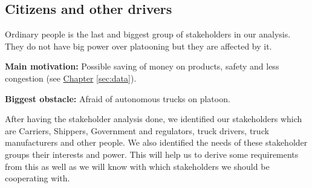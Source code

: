 \subsection{Citizens and other drivers}
% 
Ordinary people is the last and biggest group of stakeholders in our analysis. They do not have big power over platooning but they are affected by it.
% 
\par \textbf{Main motivation:} Possible saving of money on products, safety and less congestion (see \hyperref[sec:data]{Chapter} \ref{sec:data}).\par
% 
\par \textbf{Biggest obstacle:} Afraid of autonomous trucks on platoon.\par
% 
After having the stakeholder analysis done, we identified our stakeholders which are Carriers, Shippers, Government and regulators, truck drivers, truck manufacturers and other people. We also identified the needs of these stakeholder groups their interests and power. This will help us to derive some requirements from this as well as we will know with which stakeholders we should be cooperating with.